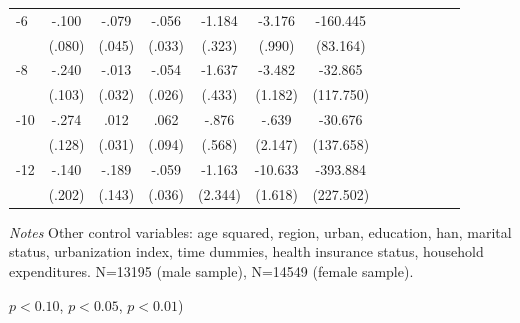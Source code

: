 \begin{table}[hp]
\begin{adjustbox}{max width=\linewidth}
\begin{threeparttable}
{\begin{tabular}{l*{6}{S S}}
-6             &    -.100         &    -.079\sym{*}  &    -.056\sym{*}  &   -1.184\sym{***}&   -3.176\sym{***}& -160.445\sym{*}  \\
                &   (.080)         &   (.045)         &   (.033)         &   (.323)         &   (.990)         & (83.164)         \\
-8             &    -.240\sym{**} &    -.013         &    -.054\sym{**} &   -1.637\sym{***}&   -3.482\sym{***}&  -32.865         \\
                &   (.103)         &   (.032)         &   (.026)         &   (.433)         &  (1.182)         &(117.750)         \\
-10            &    -.274\sym{**} &     .012         &     .062         &    -.876         &    -.639         &  -30.676         \\
                &   (.128)         &   (.031)         &   (.094)         &   (.568)         &  (2.147)         &(137.658)         \\
-12           &    -.140         &    -.189         &    -.059         &   -1.163         &  -10.633\sym{***}& -393.884\sym{*}  \\
                &   (.202)         &   (.143)         &   (.036)         &  (2.344)         &  (1.618)         &(227.502)         \\     
\bottomrule
\end{tabular}
\begin{tablenotes}
\item \textit{Notes} Other control variables: age squared, region, urban, education, han, marital status, urbanization index, time dummies, health insurance status, household expenditures. N=13195 (male sample), N=14549 (female sample).
\item \sym{*} \(p<0.10\), \sym{**} \(p<0.05\), \sym{***} \(p<0.01\))
\end{tablenotes}
}
\end{threeparttable}
\end{adjustbox}
\end{table}


